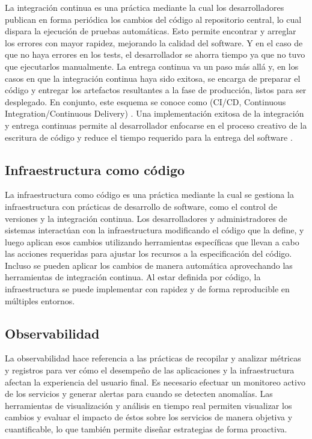 La integración continua es una práctica mediante la cual los
desarrolladores publican en forma periódica los cambios del código al
repositorio central, lo cual dispara la ejecución de pruebas
automáticas. Esto permite encontrar y arreglar los errores con mayor
rapidez, mejorando la calidad del software. Y en el caso de que no
haya errores en los tests, el desarrollador se ahorra tiempo ya que no
tuvo que ejecutarlos manualmente. La entrega continua va un paso más
allá y, en los casos en que la integración continua haya sido exitosa,
se encarga de preparar el código y entregar los artefactos resultantes
a la fase de producción, listos para ser desplegado. En conjunto, este
esquema se conoce como 
(CI/CD, Continuous Integration/Continuous Delivery)
\cite{devopscicd}. Una
implementación exitosa de la integración y entrega continuas permite
al desarrollador enfocarse en el proceso creativo de la escritura de
código y reduce el tiempo requerido para la entrega del software
\cite{humblefarley}.

\subsection{Infraestructura como código}

La infraestructura como código es una práctica mediante la cual se
gestiona la infraestructura con prácticas de desarrollo de software,
como el control de versiones y la integración continua. Los
desarrolladores y administradores de sistemas interactúan con la
infraestructura modificando el código que la define, y luego aplican
esos cambios utilizando herramientas específicas que llevan a cabo las
acciones requeridas para ajustar los recursos a la especificación del
código. Incluso se pueden aplicar los cambios de manera automática
aprovechando las herramientas de integración continua. Al estar
definida por código, la infraestructura se puede implementar con
rapidez y de forma reproducible en múltiples entornos.

\subsection{Observabilidad}

La observabilidad hace referencia a las prácticas de recopilar y
analizar métricas y registros para ver cómo el desempeño de las
aplicaciones y la infraestructura afectan la experiencia del usuario
final. Es necesario efectuar un monitoreo activo de los servicios y
generar alertas para cuando se detecten anomalías. Las herramientas de
visualización y análisis en tiempo real permiten visualizar los
cambios y evaluar el impacto de éstos sobre los servicios de manera
objetiva y cuantificable, lo que también permite diseñar estrategias
de forma proactiva.

